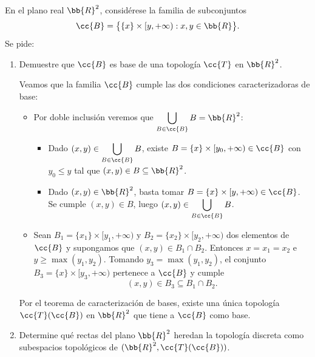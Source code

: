 \documentclass[12pt]{article}
\begin{document}
\begin{ejercicio}
En el plano real $\bb{R}^2$, considérese la familia de subconjuntos
\[
    \cc{B} = \big\{ \{x\} \times [y, +\infty) : x, y \in \bb{R} \big\}.
\]
Se pide:
\begin{enumerate}[label=\alph*)]
    \item Demuestre que $\cc{B}$ es base de una topología $\cc{T}$ en $\bb{R}^2$.
    
    Veamos que la familia $\cc{B}$ cumple las dos condiciones caracterizadoras de base:
    \begin{itemize}
        \item Por doble inclusión veremos que $\displaystyle \bigcup_{B \in \cc{B}} B = \bb{R}^2$:
        \begin{itemize}
            \item[($\subseteq$)] Dado $(x, y) \in \displaystyle \bigcup_{B \in \cc{B}} B$, existe $B = \{x\} \times [y_0, +\infty) \in \cc{B}$ con $y_0 \leq y$ tal que $(x, y) \in B \subseteq \bb{R}^2$.
            \item[($\supseteq$)] Dado $(x, y) \in \bb{R}^2$, basta tomar $B = \{x\} \times [y, +\infty) \in \cc{B}$. Se cumple $(x, y) \in B$, luego $(x, y) \in \displaystyle \bigcup_{B \in \cc{B}} B$.
        \end{itemize}
        \item Sean $B_1 = \{x_1\} \times [y_1, +\infty)$ y $B_2 = \{x_2\} \times [y_2, +\infty)$ dos elementos de $\cc{B}$ y supongamos que $(x, y) \in B_1 \cap B_2$. Entonces $x = x_1 = x_2$ e $y \geq \max(y_1, y_2)$. Tomando $y_3 = \max(y_1, y_2)$, el conjunto $B_3 = \{x\} \times [y_3, +\infty)$ pertenece a $\cc{B}$ y cumple
        \[
            (x, y) \in B_3 \subseteq B_1 \cap B_2.
        \]
    \end{itemize}
    Por el teorema de caracterización de bases, existe una única topología $\cc{T}(\cc{B})$ en $\bb{R}^2$ que tiene a $\cc{B}$ como base.

    \item Determine qué rectas del plano $\bb{R}^2$ heredan la topología discreta como subespacios topológicos de $(\bb{R}^2, \cc{T}(\cc{B}))$.


\end{enumerate}
\end{ejercicio}
\end{document}
